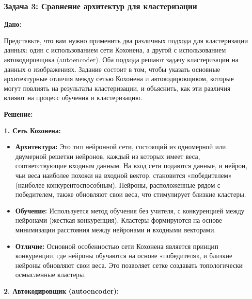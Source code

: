 \begin{itemize}
\subsubsection{Задача 3: Сравнение архитектур для кластеризации}

\textbf{Дано:}

Представьте, что вам нужно применить два различных подхода для кластеризации данных: один с использованием сети Кохонена, а другой с использованием автокодировщика (autoencoder). Оба подхода решают задачу кластеризации на данных о изображениях. Задание состоит в том, чтобы указать основные архитектурные отличия между сетью Кохонена и автокодировщиком, которые могут повлиять на результаты кластеризации, и объяснить, как эти различия влияют на процесс обучения и кластеризацию.

\textbf{Решение:}

\textbf{1. Сеть Кохонена:}

\begin{itemize}
    \item \textbf{Архитектура:} Это тип нейронной сети, состоящий из одномерной или двумерной решетки нейронов, каждый из которых имеет веса, соответствующие входным данным. На вход сети подаются данные, и нейрон, чьи веса наиболее похожи на входной вектор, становится «победителем» (наиболее конкурентоспособным). Нейроны, расположенные рядом с победителем, также обновляют свои веса, что стимулирует близкие кластеры.
    \item \textbf{Обучение:} Используется метод обучения без учителя, с конкуренцией между нейронами (жесткая конкуренция). Кластеры формируются на основе минимизации расстояния между нейронами и входными векторами.
    \item \textbf{Отличие:} Основной особенностью сети Кохонена является принцип конкуренции, где нейроны обучаются на основе «победителя», и близкие нейроны обновляют свои веса. Это позволяет сетке создавать топологически осмысленные кластеры.
\end{itemize}

\textbf{2. Автокодировщик (autoencoder):}


\end{itemize}

